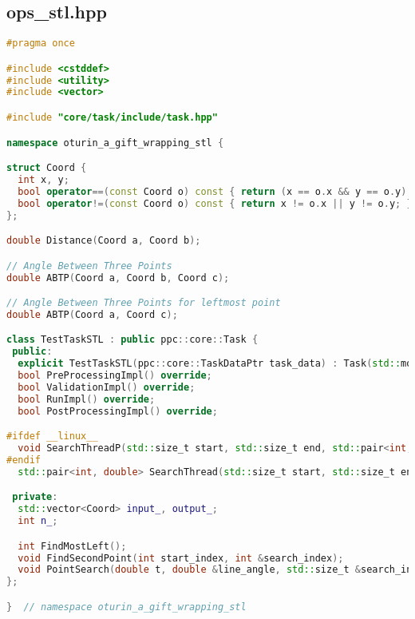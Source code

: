 \documentclass[12pt,a4paper]{extarticle}
\begin{document}
\subsection{ops\_stl.hpp}
\label{sec:stl.hpp}
\begin{lstlisting}[language=C++]
#pragma once

#include <cstddef>
#include <utility>
#include <vector>

#include "core/task/include/task.hpp"

namespace oturin_a_gift_wrapping_stl {

struct Coord {
  int x, y;
  bool operator==(const Coord o) const { return (x == o.x && y == o.y); }
  bool operator!=(const Coord o) const { return x != o.x || y != o.y; }
};

double Distance(Coord a, Coord b);

// Angle Between Three Points
double ABTP(Coord a, Coord b, Coord c);

// Angle Between Three Points for leftmost point
double ABTP(Coord a, Coord c);

class TestTaskSTL : public ppc::core::Task {
 public:
  explicit TestTaskSTL(ppc::core::TaskDataPtr task_data) : Task(std::move(task_data)) {}
  bool PreProcessingImpl() override;
  bool ValidationImpl() override;
  bool RunImpl() override;
  bool PostProcessingImpl() override;

#ifdef __linux__
  void SearchThreadP(std::size_t start, std::size_t end, std::pair<int, double> &thread_result);
#endif
  std::pair<int, double> SearchThread(std::size_t start, std::size_t end);

 private:
  std::vector<Coord> input_, output_;
  int n_;

  int FindMostLeft();
  void FindSecondPoint(int start_index, int &search_index);
  void PointSearch(double t, double &line_angle, std::size_t &search_index, std::size_t i);
};

}  // namespace oturin_a_gift_wrapping_stl
\end{lstlisting}
\end{document}
